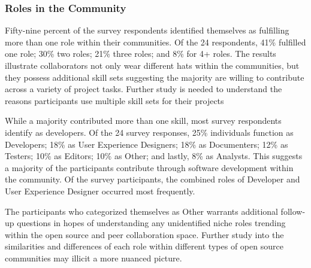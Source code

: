 \subsubsection{Roles in the Community} Fifty-nine percent of the survey respondents identified themselves as fulfilling more than one 
role within their communities. Of the 24 respondents, 41\% fulfilled one role; 30\% two roles; 21\% three roles; and 8\% for 4+ roles. 
The results illustrate collaborators not only wear different hats within the communities, but they possess additional skill sets suggesting the majority 
are willing to contribute across a variety of project tasks. Further study is needed to understand the reasons participants use multiple skill sets for their projects  

While a majority contributed more than one skill, most survey respondents identify as developers. Of the 24 survey responses, 25\% individuals function as Developers; 
18\% as User Experience Designers; 18\% as Documenters; 12\% as Testers; 10\% as Editors; 10\% as Other; and lastly, 8\% as Analysts. This suggests a majority of the participants contribute through software development 
within the community. Of the survey participants, the combined roles of Developer and User Experience Designer occurred most frequently.  
 
The participants who categorized themselves as Other warrants additional follow-up questions in hopes of understanding any unidentified niche roles 
trending within the open source and peer collaboration space. Further study into the similarities and differences of each role within different types of open source 
communities may illicit a more nuanced picture.


